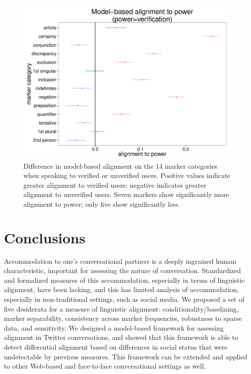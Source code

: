 \documentclass{acm_proc_article-sp}
\begin{document}
\begin{figure}[t]
\centering
\includegraphics[width=.9\columnwidth]{graphics/www2016_ourpowerdiff_verif.pdf}
\caption{Difference in model-based alignment on the 14 marker categories when speaking to verified or unverified users. Positive values indicate greater alignment to verified users; negative indicates greater alignment to unverified users. Seven markers show significantly more alignment to power; only five show significantly less.}\label{fig:our-verified}
\end{figure}

\section{Conclusions}
Accommodation to one's conversational partners is a deeply ingrained human characteristic, important for assessing the nature of conversation.  Standardized and formalized measures of this accommodation, especially in terms of linguistic alignment, have been lacking, and this has limited analysis of accommodation, especially in non-traditional settings, such as social media.  We proposed a set of five desiderata for a measure of linguistic alignment: conditionality/baselining, marker separability, consistency across marker frequencies, robustness to sparse data, and sensitivity.  We designed a model-based framework for assessing alignment in Twitter conversations, and showed that this framework is able to detect differential alignment based on differences in social status that were undetectable by previous measures.  This framework can be extended and applied to other Web-based and face-to-face conversational settings as well.
\end{document}
